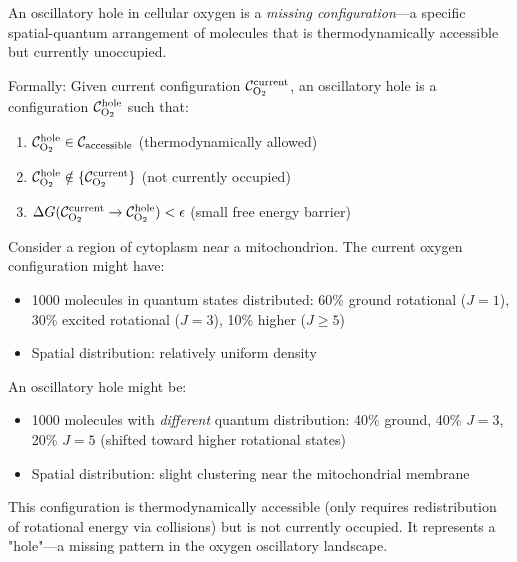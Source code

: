 \begin{definition}
\label{def:oxygen_hole}
An oscillatory hole in cellular oxygen is a \textit{missing configuration}—a specific spatial-quantum arrangement of  molecules that is thermodynamically accessible but currently unoccupied.

Formally: Given current configuration $\mathcal{C}_{\ce{O2}}^{\text{current}}$, an oscillatory hole is a configuration $\mathcal{C}_{\ce{O2}}^{\text{hole}}$ such that:
\begin{enumerate}
\item $\mathcal{C}_{\ce{O2}}^{\text{hole}} \in \mathcal{C}_{\text{accessible}}$ (thermodynamically allowed)
\item $\mathcal{C}_{\ce{O2}}^{\text{hole}} \notin \{\mathcal{C}_{\ce{O2}}^{\text{current}}\}$ (not currently occupied)
\item $\Delta G(\mathcal{C}_{\ce{O2}}^{\text{current}} \to \mathcal{C}_{\ce{O2}}^{\text{hole}}) < \epsilon$ (small free energy barrier)
\end{enumerate}
\end{definition}

\begin{example}
Consider a region of cytoplasm near a mitochondrion. The current oxygen configuration might have:
\begin{itemize}
\item 1000  molecules in quantum states distributed: 60\% ground rotational ($J=1$), 30\% excited rotational ($J=3$), 10\% higher ($J \geq 5$)
\item Spatial distribution: relatively uniform density
\end{itemize}

An oscillatory hole might be:
\begin{itemize}
\item 1000  molecules with \textit{different} quantum distribution: 40\% ground, 40\% $J=3$, 20\% $J=5$ (shifted toward higher rotational states)
\item Spatial distribution: slight clustering near the mitochondrial membrane
\end{itemize}

This configuration is thermodynamically accessible (only requires redistribution of rotational energy via collisions) but is not currently occupied. It represents a "hole"—a missing pattern in the oxygen oscillatory landscape.
\end{example}


